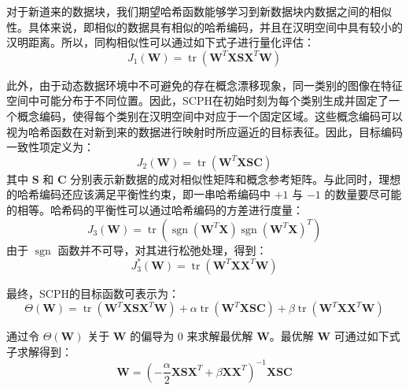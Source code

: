 对于新道来的数据块，我们期望哈希函数能够学习到新数据块内数据之间的相似性。具体来说，即相似的数据具有相似的哈希编码，并且在汉明空间中具有较小的汉明距离。所以，同构相似性可以通过如下式子进行量化评估：
\begin{equation}
  J_1(\mathbf{W}) = \operatorname{tr}(\mathbf{W}^T \mathbf{X} \mathbf{S} \mathbf{X}^T \mathbf{W})
\end{equation}

此外，由于动态数据环境中不可避免的存在概念漂移现象，同一类别的图像在特征空间中可能分布于不同位置。因此，SCPH在初始时刻为每个类别生成并固定了一个概念编码，使得每个类别在汉明空间中对应于一个固定区域。这些概念编码可以视为哈希函数在对新到来的数据进行映射时所应逼近的目标表征。因此，目标编码一致性项定义为：
\begin{equation}
  J_2(\mathbf{W}) = \operatorname{tr}(\mathbf{W}^T \mathbf{X} \mathbf{S} \mathbf{C})
\end{equation}
其中 $\mathbf{S}$ 和 $\mathbf{C}$ 分别表示新数据的成对相似性矩阵和概念参考矩阵。与此同时，理想的哈希编码还应该满足平衡性约束，即一串哈希编码中 $+1$ 与 $-1$ 的数量要尽可能的相等。哈希码的平衡性可以通过哈希编码的方差进行度量：
\begin{equation}
  J_3(\mathbf{W}) = \operatorname{tr}(\operatorname{sgn}(\mathbf{W}^T \mathbf{X}) \operatorname{sgn}(\mathbf{W}^T \mathbf{X})^T)
\end{equation}
由于 $\operatorname{sgn}$ 函数并不可导，对其进行松弛处理，得到：
\begin{equation}
  J_3^*(\mathbf{W}) = \operatorname{tr}(\mathbf{W}^T \mathbf{X} \mathbf{X}^T \mathbf{W})
\end{equation}

最终，SCPH的目标函数可表示为：
\begin{equation}
  \Theta(\mathbf{W}) = \operatorname{tr}(\mathbf{W}^T \mathbf{X} \mathbf{S} \mathbf{X}^T \mathbf{W}) + \alpha \operatorname{tr}(\mathbf{W}^T \mathbf{X} \mathbf{S} \mathbf{C}) + \beta \operatorname{tr}(\mathbf{W}^T \mathbf{X} \mathbf{X}^T \mathbf{W})
\end{equation}

通过令 $\Theta(\mathbf{W})$ 关于 $\mathbf{W}$ 的偏导为 $0$ 来求解最优解 $\mathbf{W}$。最优解 $\mathbf{W}$ 可通过如下式子求解得到：
\begin{equation}
  \mathbf{W} = \left( -\frac{\alpha}{2} \mathbf{X} \mathbf{S} \mathbf{X}^T + \beta \mathbf{X} \mathbf{X}^T \right)^{-1} \mathbf{X} \mathbf{S} \mathbf{C}
\label{eq:scph-W}
\end{equation}

